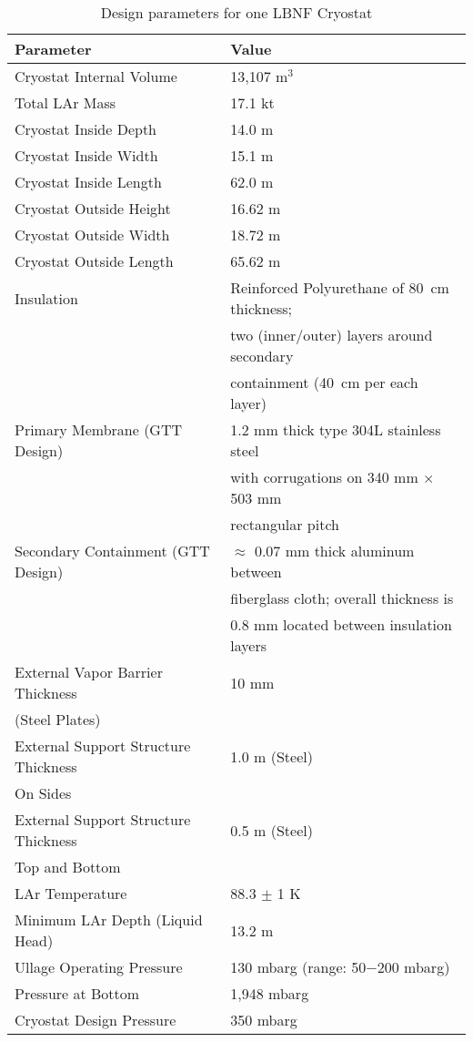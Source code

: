 \begin{table}
\caption{Design parameters for one LBNF Cryostat}
\label{table:param-summ-LBNF}
 \begin{tabular}[htbp]{|l| p{8cm} |}
\hline
\textbf{Parameter} &  \textbf{Value} \\
\hline\hline
Cryostat Internal Volume &  13,107 m$^3$ \\
\hline
Total LAr Mass & 17.1 kt \\
\hline
Cryostat Inside Depth & 14.0 m \\
\hline
Cryostat Inside Width & 15.1 m \\
\hline
Cryostat Inside Length & 62.0 m  \\
\hline
Cryostat Outside Height & 16.62 m \\
\hline
Cryostat Outside Width & 18.72 m \\
\hline
Cryostat Outside Length & 65.62 m \\
\hline
Insulation &  Reinforced Polyurethane of 80~cm thickness; \\
           &  two (inner/outer) layers around secondary \\
           &  containment (40~cm per each layer) \\ 
\hline
Primary Membrane (GTT Design) & 1.2 mm thick type 304L stainless steel \\
                              & with corrugations on 340 mm $\times$ 503 mm \\
                       & rectangular pitch\\
\hline
Secondary Containment (GTT Design) & $\approx$ 0.07 mm thick aluminum between \\ 
                            & fiberglass cloth; overall thickness is \\
                            & 0.8 mm located between insulation layers \\
\hline
External Vapor Barrier Thickness & 10 mm \\
(Steel Plates)                   &       \\
\hline
External Support Structure Thickness & 1.0 m (Steel) \\
On Sides & \\
\hline
External Support Structure Thickness & 0.5 m (Steel) \\
Top and Bottom & \\
\hline
LAr Temperature & 88.3 $\pm$ 1 K \\
\hline
Minimum LAr Depth (Liquid Head) & 13.2 m \\
\hline
Ullage Operating Pressure & 130 mbarg (range: 50$-$200 mbarg) \\
\hline
Pressure at Bottom & 1,948 mbarg \\
\hline 
Cryostat Design Pressure & 350 mbarg \\
\hline
\end{tabular} 
\end{table}

